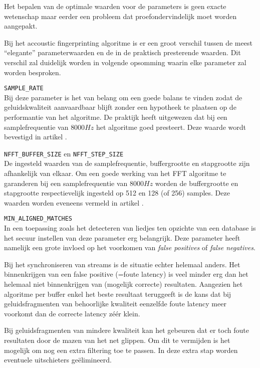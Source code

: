Het bepalen van de optimale waarden voor de parameters is geen exacte wetenschap maar eerder een probleem dat proefondervindelijk moet worden aangepakt.

Bij het accoustic fingerprinting algoritme is er een groot verschil tussen de meest ``elegante'' parameterwaarden en de in de praktisch presterende waarden. Dit verschil zal duidelijk worden in volgende opsomming waarin elke parameter zal worden besproken.


\begin{description}
	\item\texttt{SAMPLE\_RATE} \hfill \\
	Bij deze parameter is het van belang om een goede balans te vinden zodat de geluidskwaliteit aanvaardbaar blijft zonder een hypotheek te plaatsen op de performantie van het algoritme. De praktijk heeft uitgewezen dat bij een samplefrequentie van $ 8000Hz $ het algoritme goed presteert. Deze waarde wordt bevestigd in artikel \cite{six2015multimodal}.
	\item\texttt{NFFT\_BUFFER\_SIZE} en \texttt{NFFT\_STEP\_SIZE} \hfill \\
	De ingesteld waarden van de samplefrequentie, buffergrootte en stapgrootte zijn afhankelijk van elkaar. Om een goede werking van het FFT algoritme te garanderen bij een samplefrequentie van $ 8000Hz $ worden de buffergrootte en stapgrootte respectievelijk ingesteld op 512 en 128 (of 256) samples. Deze waarden worden eveneens vermeld in artikel \cite{six2015multimodal}.
	\item\texttt{MIN\_ALIGNED\_MATCHES} \hfill \\
	In een toepassing zoals het detecteren van liedjes ten opzichte van een database is het secuur instellen van deze parameter erg belangrijk. Deze parameter heeft namelijk een grote invloed op het voorkomen van \textit{false positives} of \textit{false negatives}. 
	
	Bij het synchroniseren van streams is de situatie echter helemaal anders. Het binnenkrijgen van een false positive (=foute latency) is veel minder erg dan het helemaal niet binnenkrijgen van (mogelijk correcte) resultaten. Aangezien het algoritme per buffer enkel het beste resultaat teruggeeft is de kans dat bij geluidsfragmenten van behoorlijke kwaliteit eenzelfde foute latency meer voorkomt dan de correcte latency zéér klein.
	
	Bij geluidsfragmenten van mindere kwaliteit kan het gebeuren dat er toch foute resultaten door de mazen van het net glippen. Om dit te vermijden is het mogelijk om nog een extra filtering toe te passen. In deze extra stap worden eventuele uitschieters geëlimineerd.
	

\end{description}
